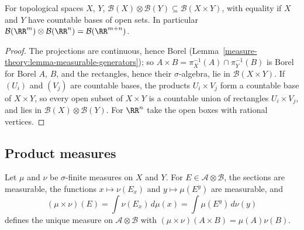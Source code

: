 \begin{proposition}\label{measure-theory:proposition-borel-product}
For topological spaces $X$, $Y$, $\mathcal{B}(X) \otimes \mathcal{B}(Y) \subseteq \mathcal{B}(X \times Y)$, with equality if $X$ and $Y$ have countable bases of open sets. In particular
$\mathcal{B}(\RR^m) \otimes \mathcal{B}(\RR^n) = \mathcal{B}(\RR^{m+n})$.
\end{proposition}

\begin{proof}
The projections are continuous, hence Borel (Lemma~\ref{measure-theory:lemma-measurable-generators}); so $A \times B = \pi_X^{-1}(A) \cap \pi_Y^{-1}(B)$ is Borel for Borel $A$, $B$, and the rectangles,
hence their $\sigma$-algebra, lie in $\mathcal{B}(X \times Y)$. If $(U_i)$ and $(V_j)$ are countable bases, the products $U_i \times V_j$ form a countable base of $X \times Y$, so every open subset of
$X \times Y$ is a countable union of rectangles $U_i \times V_j$, and lies in $\mathcal{B}(X) \otimes \mathcal{B}(Y)$. For $\RR^n$ take the open boxes with rational vertices.
\end{proof}

\subsection{Product measures}\label{measure-theory:subsection-product-measures}

\begin{theorem}\label{measure-theory:theorem-product-measure}
Let $\mu$ and $\nu$ be $\sigma$-finite measures on $X$ and $Y$. For $E \in \mathcal{A} \otimes \mathcal{B}$, the sections are measurable, the functions $x \mapsto \nu(E_x)$ and $y \mapsto \mu(E^y)$ are measurable, and
\[
(\mu \times \nu)(E) = \int\nu(E_x)\,d\mu(x) = \int\mu(E^y)\,d\nu(y)
\]
defines the unique measure on $\mathcal{A} \otimes \mathcal{B}$ with $(\mu \times \nu)(A \times B) = \mu(A)\nu(B)$.
\end{theorem}

